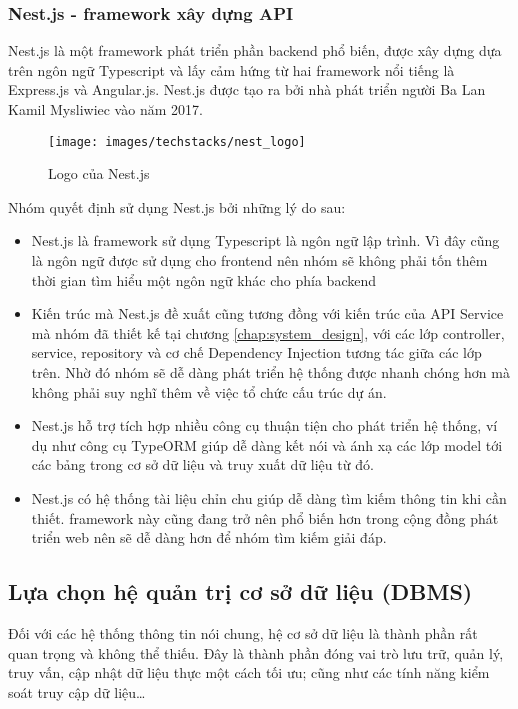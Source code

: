\documentclass[../main.tex]{subfiles}
\begin{document}
	\subsubsection{Nest.js - \Gls{framework} xây dựng API}

	Nest.js là một \Gls{framework} phát triển phần \Gls{backend} phổ biến, được xây dựng dựa trên ngôn ngữ Typescript và
	lấy cảm hứng từ hai framework nổi tiếng là Express.js và Angular.js. Nest.js được tạo ra bởi nhà phát triển người Ba
	Lan Kamil Mysliwiec vào năm 2017.

	\begin{figure}[ht]
		\centering
		\texttt{[image: images/techstacks/nest\_logo]}
		\caption{Logo của Nest.js}
		\label{fig:nest-logo}
	\end{figure}

	Nhóm quyết định sử dụng Nest.js bởi những lý do sau:

	\begin{itemize}
		\item Nest.js là \Gls{framework} sử dụng Typescript là ngôn ngữ lập trình. Vì đây cũng là ngôn ngữ được sử dụng cho
		\Gls{frontend} nên nhóm sẽ không phải tốn thêm thời gian tìm hiểu một ngôn ngữ khác cho phía \Gls{backend}
		\item Kiến trúc mà Nest.js đề xuất cũng tương đồng với kiến trúc của API Service mà nhóm đã thiết kế tại chương
		\ref{chap:system_design}, với các lớp controller, service, repository và cơ chế Dependency Injection tương tác
		giữa các lớp trên. Nhờ đó nhóm sẽ dễ dàng phát triển hệ thống được nhanh chóng hơn mà không phải suy nghĩ thêm về
		việc tổ chức cấu trúc dự án.
		\item Nest.js hỗ trợ tích hợp nhiều công cụ thuận tiện cho phát triển hệ thống, ví dụ như công cụ TypeORM giúp dễ
		dàng kết nói và ánh xạ các lớp model tới các bảng trong cơ sở dữ liệu và truy xuất dữ liệu từ đó.
		\item Nest.js có hệ thống tài liệu chỉn chu giúp dễ dàng tìm kiếm thông tin khi cần thiết. \Gls{framework} này cũng
		đang trở nên phổ biến hơn trong cộng đồng phát triển web nên sẽ dễ dàng hơn để nhóm tìm kiếm giải đáp.
	\end{itemize}

	\subsection{Lựa chọn hệ quản trị cơ sở dữ liệu (DBMS)}

	Đối với các hệ thống thông tin nói chung, hệ cơ sở dữ liệu là thành phần rất quan trọng và không thể thiếu. Đây là
	thành phần đóng vai trò lưu trữ, quản lý, truy vấn, cập nhật dữ liệu thực một cách tối ưu; cũng như các tính năng kiểm
	soát truy cập dữ liệu\ldots
\end{document}
